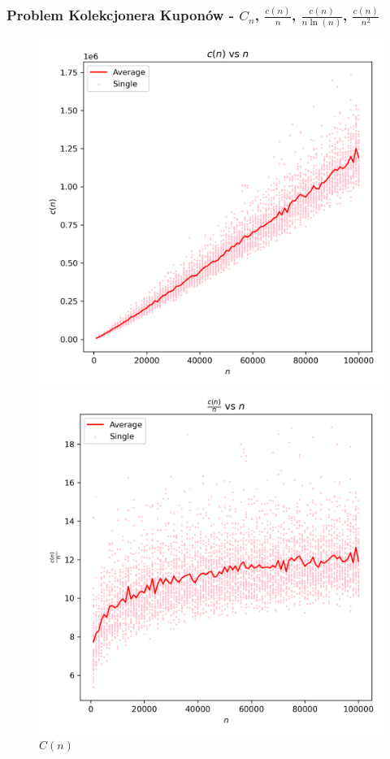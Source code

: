 \documentclass{article}
\begin{document}
\subsubsection{Problem Kolekcjonera Kuponów - $C_n$, $\frac{c(n)}{n}$, $\frac{c(n)}{n\ln(n)}$, $\frac{c(n)}{n^2}$}

\begin{figure}[H]
    \centering
    \begin{minipage}{0.24\textwidth}
        \centering
        \includegraphics[width=\linewidth]{graphs/c_factor_vs_n.png}
        \caption{$C(n)$}
    \end{minipage}
    \begin{minipage}{0.24\textwidth}
        \centering
        \includegraphics[width=\linewidth]{graphs/c_factor_over_n_vs_n.png}

\end{minipage}
\end{figure}
\end{document}
